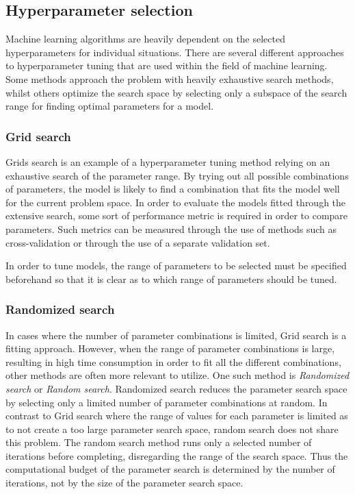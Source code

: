 \subsection{Hyperparameter selection}

Machine learning algorithms are heavily dependent on the selected hyperparameters for individual situations.
There are several different approaches to hyperparameter tuning that are used within the field of machine learning.
Some methods approach the problem with heavily exhaustive search methods,
whilst others optimize the search space by selecting only a subspace of the search range for finding optimal parameters for a model.

\subsubsection{Grid search}
Grids search is an example of a hyperparameter tuning method relying on an exhaustive search of the parameter range.
By trying out all possible combinations of parameters, the model is likely to find a combination that fits the model well for the current problem space.
In order to evaluate the models fitted through the extensive search, some sort of performance metric is required in order to compare parameters.
Such metrics can be measured through the use of methods such as cross-validation or through the use of a separate validation set.

In order to tune models, the range of parameters to be selected must be specified beforehand so that it is clear as to which range of parameters should be tuned.
\cite{Geron2017}


\subsubsection{Randomized search}
In cases where the number of parameter combinations is limited, Grid search is a fitting approach.
However, when the range of parameter combinations is large, resulting in high time consumption in order to fit all the different combinations,
other methods are often more relevant to utilize.
One such method is \textit{Randomized search} or \textit{Random search}.
Randomized search reduces the parameter search space by selecting only a limited number of parameter combinations at random.
In contrast to Grid search where the range of values for each parameter is limited as to not create a too large parameter search space,
random search does not share this problem.
The random search method runs only a selected number of iterations before completing, disregarding the range of the search space.
Thus the computational budget of the parameter search is determined by the number of iterations, not by the size of the parameter search space.
\cite{Geron2017}


